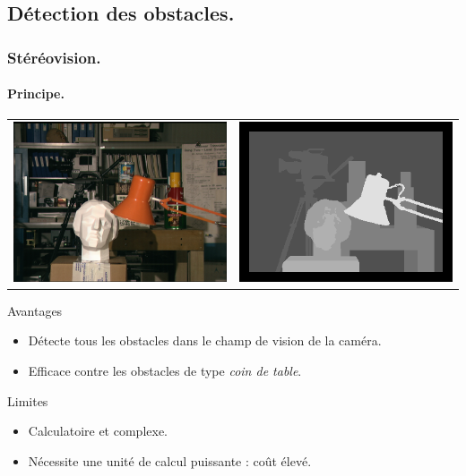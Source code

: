 \subsection[Obstacles]{Détection des obstacles.}
\begin{frame}
    \frametitle{Stéréovision.}
    \framesubtitle{Principe.}
    \begin{tabular}{cc}
        \includegraphics[width=.4\linewidth]{rcs/tsukuba.png} & \includegraphics[width=.4\linewidth]{rcs/tsukuba_disp.png} \\
    \end{tabular}
     { \begin{exampleblock}{Avantages}
            \begin{itemize}
                \pause \item Détecte tous les obstacles dans le champ de vision de la caméra.
                \pause \item Efficace contre les obstacles de type \emph{coin de table}.
            \end{itemize}
    \end{exampleblock} }
     { \begin{alertblock}{Limites}
            \begin{itemize}
                \pause \item Calculatoire et complexe.
                \pause \item Nécessite une unité de calcul puissante : coût élevé.
            \end{itemize}
    \end{alertblock} }
\end{frame}

